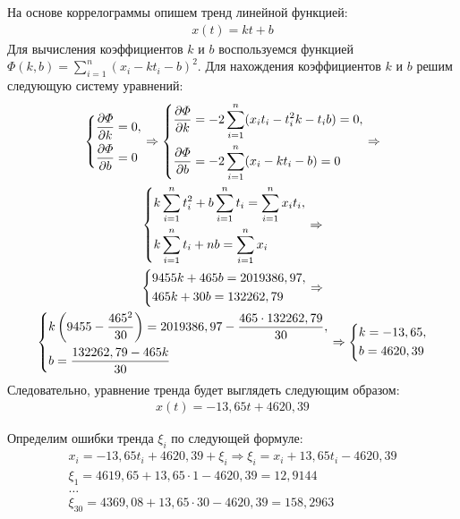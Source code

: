 \documentclass[utf8, a4paper, 14pt, russian, oneside]{book}
\begin{document}
На основе коррелограммы опишем тренд линейной функцией:
\begin{gather*}
    x(t) = kt + b
\end{gather*}
Для вычисления коэффициентов $k$ и $b$ воспользуемся функцией $\varPhi(k, b) = \sum\limits_{i=1}^n (x_i - kt_i -b)^2$. Для нахождения коэффициентов $k$ и $b$ решим следующую систему уравнений:
\begin{gather*}
    \begin{dcases}
         \frac{\partial \varPhi}{\partial k}  = 0, \\
         \frac{\partial \varPhi}{\partial b}  = 0
    \end{dcases}
    \Rightarrow
    \begin{dcases}
         \frac{\partial \varPhi}{\partial k}  = -2 \sum\limits_{i=1}^n (x_it_i - t_i^2k - t_ib) = 0, \\
         \frac{\partial \varPhi}{\partial b}  = -2 \sum\limits_{i=1}^n (x_i - kt_i - b) = 0
    \end{dcases}
    \Rightarrow \\
    \begin{dcases}
        k \sum\limits_{i=1}^n t_i^2 + b \sum\limits_{i=1}^n t_i = \sum\limits_{i=1}^n x_it_i, \\
        k \sum\limits_{i=1}^n t_i + nb = \sum\limits_{i=1}^n x_i
    \end{dcases}
    \Rightarrow \\
    \begin{dcases}
        9455k + 465b = 2019386,97, \\
        465k + 30 b = 132262,79 \\
    \end{dcases}
    \Rightarrow \\
    \begin{dcases}
        k\left(9455 - \frac{465^2}{30}\right) = 2019386,97 - \frac{465 \cdot 132262,79}{30}, \\
        b = \frac{132262,79 - 465k}{30}
    \end{dcases}
    \Rightarrow
    \begin{dcases}
        k = -13,65, \\
        b = 4620,39
    \end{dcases}
\end{gather*}
Следовательно, уравнение тренда будет выглядеть следующим образом:
\begin{gather*}
    x(t) = -13,65t + 4620,39
\end{gather*}
\newpage

Определим ошибки тренда $\xi_i$ по следующей формуле:
\begin{gather*}
    x_i = -13,65 t_i + 4620,39 + \xi_i \Rightarrow \xi_i = x_i + 13,65 t_i - 4620,39 \\
    \xi_1 = 4619,65 + 13,65 \cdot 1 - 4620,39 = 12,9144 \\
    \ldots \\
    \xi_{30} = 4369,08 + 13,65 \cdot 30 - 4620,39 = 158,2963
\end{gather*}
\end{document}
